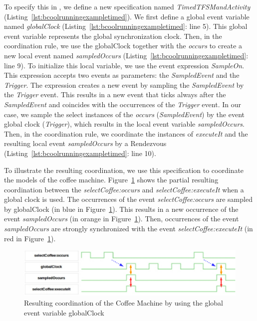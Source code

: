 To specify this in \bcool, we define a new specification named \emph{TimedTFSMandActivity} (Listing~\ref{lst:bcoolrunningexampletimed}). We first define a global event variable named \emph{globalClock} (Listing~\ref{lst:bcoolrunningexampletimed}: line 5). This global event variable represents the global synchronization clock. Then, in the coordination rule, we use the globalClock together with the \dse \emph{occurs} to create a new local event named \emph{sampledOccurs} (Listing~\ref{lst:bcoolrunningexampletimed}: line 9). To initialize this local variable, we use the event expression \emph{SampleOn}. This expression accepts two events as parameters: the \emph{SampledEvent} and the \emph{Trigger}. The expression creates a new event by sampling the \emph{SampledEvent} by the \emph{Trigger} event. This results in a new event that ticks always after the \emph{SampledEvent} and coincides with the occurrences of the \emph{Trigger} event. In our case, we sample the select instances of the \dse \emph{occurs} (\ie \emph{SampledEvent}) by the event global clock (\ie \emph{Trigger}), which results in the local event variable \emph{sampledOccurs}. Then, in the coordination rule, we coordinate the instances of \dse \emph{executeIt} and the resulting local event \emph{sampledOccurs} by a Rendezvous (Listing~\ref{lst:bcoolrunningexampletimed}: line 10). 

To illustrate the resulting coordination, we use this specification to coordinate the models of the coffee machine. Figure~\ref{fig:runningeventvar} shows the partial resulting coordination between the \mse \emph{selectCoffee:occurs} and \emph{selectCoffee:executeIt} when a global clock is used. The occurrences of the event \emph{selectCoffee:occurs} are sampled by globalClock (in blue in Figure~\ref{fig:runningeventvar}). This results in a new occurrence of the event \emph{sampledOccurs} (in orange in Figure~\ref{fig:runningeventvar}). Then, occurrences of the event \emph{sampledOccurs} are strongly synchronized with the event \emph{selectCoffee:executeIt} (in red in Figure~\ref{fig:runningeventvar}). 

		\begin{figure}[h]
			\center
			\includegraphics[width=.9\textwidth]{bcool/figs/runningeventvar}
			\caption{Resulting coordination of the Coffee Machine by using the global event variable globalClock}
			\label{fig:runningeventvar}
		\end{figure}



